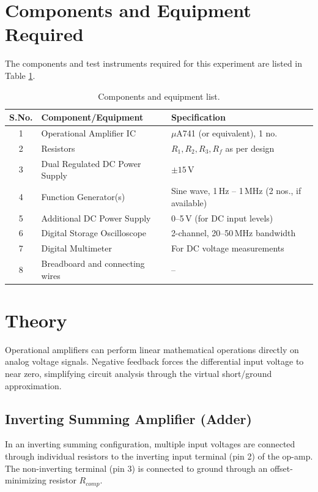 \section{Components and Equipment Required}
The components and test instruments required for this experiment are listed in Table \ref{tab:components_opamp2}.

\begin{table}[h!]
	\centering
	\begin{tabular}{@{}cll@{}}
		\toprule
		S.No. & Component/Equipment & Specification \\
		\midrule
		1  & Operational Amplifier IC & $\mu$A741 (or equivalent), 1 no. \\
		2  & Resistors & $R_1, R_2, R_3, R_f$ as per design \\
		3  & Dual Regulated DC Power Supply & $\pm 15\,\text{V}$ \\
		4  & Function Generator(s) & Sine wave, 1\,Hz -- 1\,MHz (2 nos., if available) \\
		5  & Additional DC Power Supply & 0--5\,V (for DC input levels) \\
		6  & Digital Storage Oscilloscope & 2-channel, 20--50\,MHz bandwidth \\
		7  & Digital Multimeter & For DC voltage measurements \\
		8  & Breadboard and connecting wires & -- \\
		\bottomrule
	\end{tabular}
	\caption{Components and equipment list.}
	\label{tab:components_opamp2}
\end{table}

\section{Theory}
Operational amplifiers can perform linear mathematical operations directly on analog voltage signals. Negative feedback forces the differential input voltage to near zero, simplifying circuit analysis through the virtual short/ground approximation.

\subsection{Inverting Summing Amplifier (Adder)}
In an inverting summing configuration, multiple input voltages are connected through individual resistors to the inverting input terminal (pin 2) of the op-amp. The non-inverting terminal (pin 3) is connected to ground through an offset-minimizing resistor $R_{comp}$.


